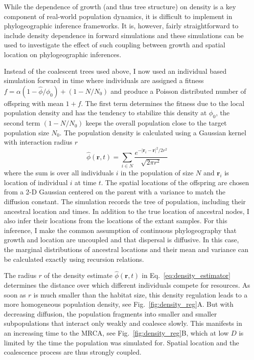 \documentclass[aps,rmp, twocolumn]{revtex4}
\newcommand{\rvec}{\mathbf{r}}
\begin{document}
While the dependence of growth (and thus tree structure) on density is a key component of real-world population dynamics, it is difficult to implement in phylogeographic inference frameworks.
It is, however, fairly straightforward to include density dependence in forward simulations and these simulations can be used to investigate the effect of such coupling between growth and spatial location on phylogeographic inferences.

Instead of the coalescent trees used above, I now used an individual based simulation forward in time where individuals are assigned a fitness $f=\alpha(1-\hat{\phi}/\phi_0) + (1-N/N_0)$ and produce a Poisson distributed number of offspring with mean $1+f$.
The first term determines the fitness due to the local population density and has the tendency to stabilize this density at $\phi_0$, the second term $(1-N/N_0)$ keeps the overall population close to the target population size $N_0$.
The population density is calculated using a Gaussian kernel with interaction radius $r$
\begin{equation}
    \label{eq:density_estimator}
    \hat{\phi}(\rvec, t) = \sum_{i\in N} \frac{e^{-|\rvec_i - \rvec|^2/2r^2}}{\sqrt{2\pi r^2}}
\end{equation}
where the sum is over all individuals $i$ in the population of size $N$ and $\rvec_i$ is location of individual $i$ at time $t$.
The spatial locations of the offspring are chosen from a 2-D Gaussian centered on the parent with a variance to match the diffusion constant.
The simulation records the tree of population, including their ancestral location and times.
In addition to the true location of ancestral nodes, I also infer their locations from the locations of the extant samples.
For this inference, I make the common assumption of continuous phylogeography that growth and location are uncoupled and that dispersal is diffusive.
In this case, the marginal distributions of ancestral locations and their mean and variance can be calculated exactly using recursion relations.

The radius $r$ of the density estimate $\hat{\phi}(\rvec, t)$ in Eq.~\ref{eq:density_estimator} determines the distance over which different individuals compete for resources.
As soon as $r$ is much smaller than the habitat size, this density regulation leads to a more homogeneous population density, see Fig.~\ref{fig:density_reg}A.
But with decreasing diffusion, the population fragments into smaller and smaller subpopulations that interact only weakly and coalesce slowly.
This manifests in an increasing time to the MRCA, see Fig.~\ref{fig:density_reg}B, which at low $D$ is limited by the time the population was simulated for.
Spatial location and the coalescence process are thus strongly coupled.
\end{document}
